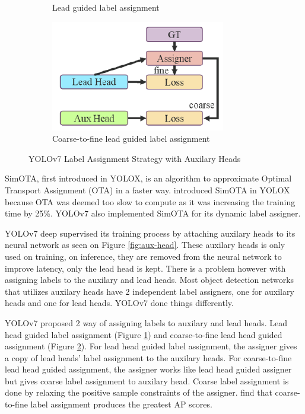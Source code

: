 \begin{figure}[H]
\begin{subfigure}[][][t]{0.3\textwidth}
        \caption{Lead guided label assignment}
        \label{fig:lead-head}
      \end{subfigure}\hfill
      \begin{subfigure}[][][t]{0.3\textwidth}
        \includegraphics[width=1\linewidth]{figures/coarse-to-fine.png}
        \caption{Coarse-to-fine lead guided label assignment}
        \label{fig:coarse-to-fine}
      \end{subfigure}

      \caption{YOLOv7 Label Assignment Strategy with Auxilary Heads}
      \label{fig:labelassigner}
  \end{figure}
  SimOTA, first introduced in YOLOX, is an algorithm to approximate Optimal Transport Assignment (OTA)
  in a faster way. \textcite{yolox} introduced SimOTA in YOLOX because OTA was deemed too slow to compute
  as it was increasing the training time by 25\%. YOLOv7 also implemented SimOTA for its dynamic label assigner.

  YOLOv7 deep supervised its training process by attaching auxilary heads to its neural network
  as seen on Figure \ref{fig:aux-head}.
  These auxilary heads is only used on training, on inference, they are removed from the neural network
  to improve latency, only the lead head is kept. There is a problem however with assigning labels
  to the auxilary and lead heads. Most object detection networks that utilizes auxilary heads have 2
  independent label assigners, one for auxilary heads and one for lead heads. YOLOv7 done things differently.


  YOLOv7 proposed 2 way of assigning labels to auxilary and lead heads. Lead head guided label assignment (Figure \ref{fig:lead-head}) and
  coarse-to-fine lead head guided assignment (Figure \ref{fig:coarse-to-fine}). For lead head guided label assignment, the assigner gives a copy
  of lead heads' label assignment to the auxilary heads. For coarse-to-fine lead head guided assignment, the 
  assigner works like lead head guided assigner but gives coarse label assignment to auxilary head. Coarse label
  assignment is done by relaxing the positive sample constraints of the assigner. \textcite{yolov7} find that coarse-to-fine
  label assignment produces the greatest AP scores.
  
